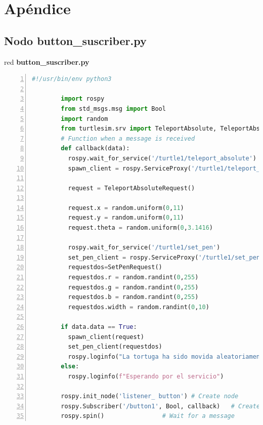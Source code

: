 \documentclass{article}
\begin{document}
\newpage

  

\nocite{clase,ros}


\printbibliography[heading=bibintoc,title={Referencias}]


\newpage
\section{Apéndice}
\subsection{Nodo button\_suscriber.py}
\begin{bodyblock}{red}{ \textbf{button\_suscriber.py}}
  \begin{lstlisting}[language=Python, mathescape=true, breaklines=true,numbers=left,
    xleftmargin=0.03\textwidth, columns=fullflexible, flexiblecolumns=true, gobble=8,style=mystyle]    
        #!/usr/bin/env python3

        import rospy
        from std_msgs.msg import Bool
        import random
        from turtlesim.srv import TeleportAbsolute, TeleportAbsoluteRequest, SetPen,SetPenRequest
        # Function when a message is received
        def callback(data):
          rospy.wait_for_service('/turtle1/teleport_absolute')
          spawn_client = rospy.ServiceProxy('/turtle1/teleport_absolute',TeleportAbsolute)

          request = TeleportAbsoluteRequest()

          request.x = random.uniform(0,11)
          request.y = random.uniform(0,11)
          request.theta = random.uniform(0,3.1416)

          rospy.wait_for_service('/turtle1/set_pen')
          set_pen_client = rospy.ServiceProxy('/turtle1/set_pen',SetPen)
          requestdos=SetPenRequest()
          requestdos.r = random.randint(0,255) 
          requestdos.g = random.randint(0,255)
          requestdos.b = random.randint(0,255)
          requestdos.width = random.randint(0,10)
              
        if data.data == True:
          spawn_client(request)
          set_pen_client(requestdos)
          rospy.loginfo("La tortuga ha sido movida aleatoriamente")
        else:
          rospy.loginfo(f"Esperando por el servicio")

        rospy.init_node('listener_ button') # Create node
        rospy.Subscriber('/button1', Bool, callback)   # Create subscriber
        rospy.spin()                # Wait for a message
\end{lstlisting}
\end{bodyblock}
\end{document}
